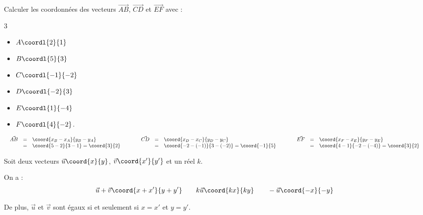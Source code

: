 \begin{methode}
	Calculer les coordonnées des vecteurs $\vec{AB}$, $\vec{CD}$ et $\vec{EF}$ avec :
	\begin{multicols}{3}
		\begin{itemize}
			\item $A\coordl{2}{1}$
			\item $B\coordl{5}{3}$
			\item $C\coordl{-1}{-2}$
			\item $D\coordl{-2}{3}$
			\item $E\coordl{1}{-4}$
			\item $F\coordl{4}{-2}$.
		\end{itemize}
	\end{multicols}

	\begin{correction}
		\[
			\begin{array}{lllll}
				\begin{array}{rcl} \vec{AB} & = & \coord{x_B-x_A}{y_B-y_A} \\ & = & \coord{5-2}{3-1} = \coord{3}{2} \end{array}         & \qquad
				\begin{array}{rcl} \vec{CD} & = & \coord{x_D-x_C}{y_D-y_C} \\ & = & \coord{-2-(-1)}{3-(-2)} = \coord{-1}{5} \end{array} & \qquad
				\begin{array}{rcl} \vec{EF} & = & \coord{x_F-x_E}{y_F-y_E} \\ & = & \coord{4-1}{-2-(-4)} = \coord{3}{2} \end{array}
			\end{array}
		\]
	\end{correction}
\end{methode}

\begin{prop}
	Soit deux vecteurs $\vec{u}\coord{x}{y}$, $\vec{v}\coord{x'}{y'}$ et un réel $k$.

	On a :
	\[
		\vec{u} + \vec{v} \coord{x+x'}{y+y'}
		\qquad
		k\vec{u} \coord{kx}{ky}
		\qquad
		-\vec{u} \coord{-x}{-y}
	\]

	De plus, $\vec{u}$ et $\vec{v}$ sont égaux si et seulement si $x = x'$ et $y = y'$.
\end{prop}

